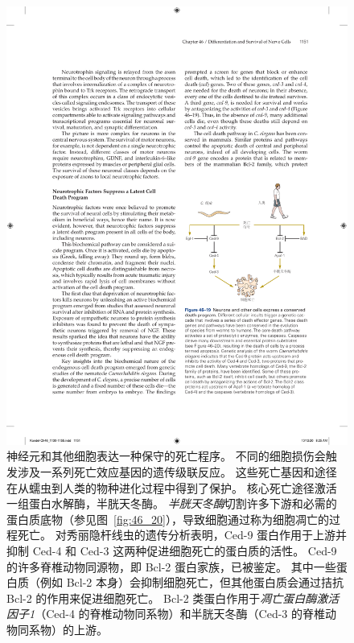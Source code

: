 \begin{figure}[htbp]
	\centering
	\includegraphics[width=0.89\linewidth]{chap46/fig_46_19}
	\caption{神经元和其他细胞表达一种保守的死亡程序。
	不同的细胞损伤会触发涉及一系列死亡效应基因的遗传级联反应。
	这些死亡基因和途径在从蠕虫到人类的物种进化过程中得到了保护。
	核心死亡途径激活一组蛋白水解酶，半胱天冬酶。
	\textit{半胱天冬酶}切割许多下游和必需的蛋白质底物（参见图~\ref{fig:46_20}），导致细胞通过称为细胞凋亡的过程死亡。
	对秀丽隐杆线虫的遗传分析表明，Ced-9 蛋白作用于上游并抑制 Ced-4 和 Ced-3 这两种促进细胞死亡的蛋白质的活性。
	Ced-9 的许多脊椎动物同源物，即 Bcl-2 蛋白家族，已被鉴定。
	其中一些蛋白质（例如 Bcl-2 本身）会抑制细胞死亡，但其他蛋白质会通过拮抗 Bcl-2 的作用来促进细胞死亡。
	Bcl-2 类蛋白作用于\textit{凋亡蛋白酶激活因子1}（Ced-4 的脊椎动物同系物）和半胱天冬酶（Ced-3 的脊椎动物同系物）的上游。}
	\label{fig:46_19}
\end{figure}


